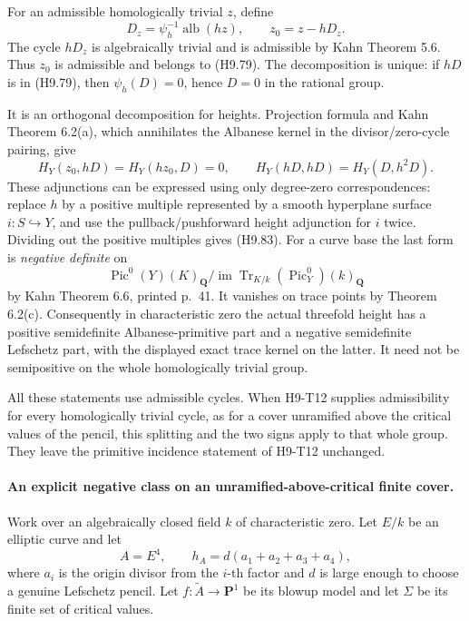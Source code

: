 \documentclass[11pt,a4paper]{article}
\begin{document}
For an admissible homologically trivial $z$, define
\[
 D_z=\psi_h^{-1}\operatorname{alb}(hz),
       \qquad z_0=z-hD_z.
                                                               \tag{H9.82}
\]
The cycle $hD_z$ is algebraically trivial and is admissible by
Kahn Theorem 5.6. Thus $z_0$ is admissible and belongs to (H9.79).
The decomposition is unique: if $hD$ is in (H9.79), then
$\psi_h(D)=0$, hence $D=0$ in the rational group.

It is an orthogonal decomposition for heights. Projection formula
and Kahn Theorem 6.2(a), which annihilates the Albanese kernel in
the divisor/zero-cycle pairing, give
\[
 H_Y(z_0,hD)=H_Y(hz_0,D)=0,
 \qquad
 H_Y(hD,hD)=H_Y(D,h^2D).                                   \tag{H9.83}
\]
These adjunctions can be expressed using only degree-zero
correspondences: replace $h$ by a positive multiple represented by
a smooth hyperplane surface $i:S\hookrightarrow Y$, and use the
pullback/pushforward height adjunction for $i$ twice. Dividing out
the positive multiples gives (H9.83).
For a curve base the last form is \emph{negative definite} on
\[
 \operatorname{Pic}^0(Y)(K)_{\mathbf Q}/
       \operatorname{im}\operatorname{Tr}_{K/k}
                         (\operatorname{Pic}^0_Y)(k)_{\mathbf Q}
\]
by Kahn Theorem 6.6, printed p.~41. It vanishes on trace points by
Theorem 6.2(c). Consequently in characteristic zero the actual
threefold height has a positive semidefinite Albanese-primitive
part and a negative semidefinite Lefschetz part, with the displayed
exact trace kernel on the latter. It need not be semipositive on
the whole homologically trivial group.

All these statements use admissible cycles. When H9-T12 supplies
admissibility for every homologically trivial cycle, as for a cover
unramified above the critical values of the pencil, this splitting
and the two signs apply to that whole group. They leave the
primitive incidence statement of H9-T12 unchanged.

\paragraph{An explicit negative class on an unramified-above-critical finite cover.}
Work over an algebraically closed field $k$ of characteristic zero.
Let $E/k$ be an elliptic curve and let
\[
 A=E^4,\qquad h_A=d(a_1+a_2+a_3+a_4),
\]
where $a_i$ is the origin divisor from the $i$-th factor and $d$
is large enough to choose a genuine Lefschetz pencil. Let
$f:\widetilde A\to\mathbf P^1$ be its blowup model and let
$\Sigma$ be its finite set of critical values.
\end{document}
